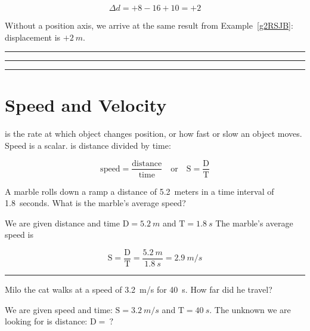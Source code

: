 \documentclass{article}
\begin{document}
\begin{equation*}
    \Delta d = + 8 - 16 + 10 = +2
\end{equation*}

Without a position axis, we arrive at the same result from Example~\ref{g2RSJB}: displacement is $+\SI{2}{m}$.

\hrule

\vspace{1em}

\hrule


\hrule

\section{Speed and Velocity} \label{nqhUSe}

 is the rate at which object changes position, or how fast or slow an object moves. Speed is a scalar.  is distance divided by time:

\begin{equation} \label{Sni2AA}
    \mathrm{speed = \frac{distance}{time}} \hspace{1em}
    \text{or} \hspace{1em}
    \mathrm{S = \frac{D}{T}}
\end{equation}


\begin{example}
A marble rolls down a ramp a distance of \SI{5.2}{meters} in a time interval of \SI{1.8}{seconds}. What is the marble's average speed?
\end{example}

 We are given distance and time $\mathrm{D} = \SI{5.2}{m}$ and $\mathrm{T} = \SI{1.8}{s}$ The marble's average speed is

\begin{equation*}
    \mathrm{S = \frac{D}{T}} = \frac{\SI{5.2}{m}}{\SI{1.8}{s}} = \SI{2.9}{m/s}
\end{equation*}

\hrule

\begin{example}
    Milo the cat walks at a speed of \SI{3.2}{m/s} for \SI{40}{s}. How far did he travel?
\end{example}

 We are given speed and time: $\mathrm{S} = \SI{3.2}{m/s}$ and $\text{T} = \SI{40}{s}$. The unknown we are looking for is distance: $\text{D} =\ ?$ 
\end{document}
